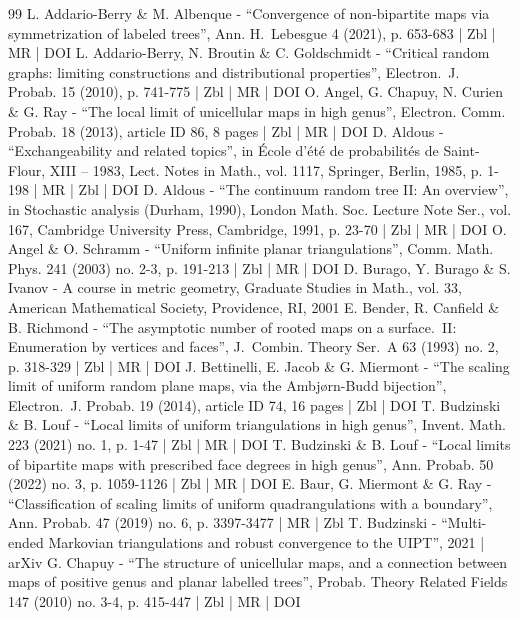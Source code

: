 \begin{thebibliography}{99}
L. Addario-Berry \& M. Albenque - “Convergence of non-bipartite maps via symmetrization of labeled trees”, Ann. H. Lebesgue 4 (2021), p. 653-683 | Zbl | MR | DOI
L. Addario-Berry, N. Broutin \& C. Goldschmidt - “Critical random graphs: limiting constructions and distributional properties”, Electron. J. Probab. 15 (2010), p. 741-775 | Zbl | MR | DOI
O. Angel, G. Chapuy, N. Curien \& G. Ray - “The local limit of unicellular maps in high genus”, Electron. Comm. Probab. 18 (2013), article ID 86, 8 pages | Zbl | MR | DOI
D. Aldous - “Exchangeability and related topics”, in École d’été de probabilités de Saint-Flour, XIII – 1983, Lect. Notes in Math., vol. 1117, Springer, Berlin, 1985, p. 1-198 | MR | Zbl | DOI
D. Aldous - “The continuum random tree II: An overview”, in Stochastic analysis (Durham, 1990), London Math. Soc. Lecture Note Ser., vol. 167, Cambridge University Press, Cambridge, 1991, p. 23-70 | Zbl | MR | DOI
O. Angel \& O. Schramm - “Uniform infinite planar triangulations”, Comm. Math. Phys. 241 (2003) no. 2-3, p. 191-213 | Zbl | MR | DOI
D. Burago, Y. Burago \& S. Ivanov - A course in metric geometry, Graduate Studies in Math., vol. 33, American Mathematical Society, Providence, RI, 2001
E. Bender, R. Canfield \& B. Richmond - “The asymptotic number of rooted maps on a surface. II: Enumeration by vertices and faces”, J. Combin. Theory Ser. A 63 (1993) no. 2, p. 318-329 | Zbl | MR | DOI
J. Bettinelli, E. Jacob \& G. Miermont - “The scaling limit of uniform random plane maps, via the Ambjørn-Budd bijection”, Electron. J. Probab. 19 (2014), article ID 74, 16 pages | Zbl | DOI
T. Budzinski \& B. Louf - “Local limits of uniform triangulations in high genus”, Invent. Math. 223 (2021) no. 1, p. 1-47 | Zbl | MR | DOI
T. Budzinski \& B. Louf - “Local limits of bipartite maps with prescribed face degrees in high genus”, Ann. Probab. 50 (2022) no. 3, p. 1059-1126 | Zbl | MR | DOI
E. Baur, G. Miermont \& G. Ray - “Classification of scaling limits of uniform quadrangulations with a boundary”, Ann. Probab. 47 (2019) no. 6, p. 3397-3477 | MR | Zbl
T. Budzinski - “Multi-ended Markovian triangulations and robust convergence to the UIPT”, 2021 | arXiv
G. Chapuy - “The structure of unicellular maps, and a connection between maps of positive genus and planar labelled trees”, Probab. Theory Related Fields 147 (2010) no. 3-4, p. 415-447 | Zbl | MR | DOI

\end{thebibliography}
